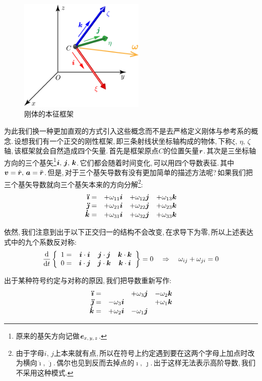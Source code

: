 \begin{figure}\label{6-1-8}
\vspace{-0.2cm}
\centering
\includegraphics[width=6cm]{image/6-1-8.png}
\caption{刚体的本征框架}
\end{figure}
为此我们换一种更加直观的方式引入这些概念而不是去严格定义刚体与参考系的概念.\,设想我们有一个正交的刚性框架,\,即三条射线状坐标轴构成的物体,\,下称$\xi,\,\eta,\,\zeta$轴,\,该框架就会自然造成四个矢量.\,首先是框架原点$C$的位置矢量$\boldsymbol{r}$.\,其次是三坐标轴方向的三个基矢\footnote{原来的基矢方向记做$\boldsymbol{e}_{x,\,y,\,z}$.}$\boldsymbol{i},\,\boldsymbol{j},\,\boldsymbol{k}$.\,它们都会随着时间变化,\,可以用四个导数表征.\,其中$\boldsymbol{v}=\dot{\boldsymbol{r}},\,\boldsymbol{a}=\ddot{\boldsymbol{r}}$.\,但是,\,对于三个基矢导数有没有更加简单的描述方法呢?\,如果我们把三个基矢导数就向三个基矢本来的方向分解\footnote{由于字母$i,\,j$上本来就有点,\,所以在符号上约定遇到要在这两个字母上加点时改为横向$\ddot{\imath},\,\ddot{\jmath}$.\,偶尔也见到反而去掉点的$\imath,\,\jmath$.\,出于这样无法表示高阶导数,\,我们不采用这种模式.}:
\[\begin{array}{rlll}
\boldsymbol{\ddot{\imath}}=		&	+\omega_{11}\boldsymbol{i} 	&	+\omega_{12}\boldsymbol{j} 		& +\omega_{13}\boldsymbol{k}\\
\boldsymbol{\ddot{\jmath}}=		&	+\omega_{21}\boldsymbol{i} 	&	+\omega_{22}\boldsymbol{j} 		& +\omega_{23}\boldsymbol{k}\\
\boldsymbol{\dot{k}}=				&	+\omega_{31}\boldsymbol{i} 	&	+\omega_{32}\boldsymbol{j} 		& +\omega_{33}\boldsymbol{k}
\end{array}\]

依然,\,我们注意到出于以下正交归一的结构不会改变,\,在求导下为零,\,所以上述表达式中的九个系数反对称:
\[\frac{\textrm{d}}{\textrm{d} t}\left\{\begin{array}{cccc}
1= 	&\boldsymbol{i}\cdot\boldsymbol{i} 	&\boldsymbol{j}\cdot\boldsymbol{j} 	&\boldsymbol{k}\cdot\boldsymbol{k} 	\\
0= 	&\boldsymbol{i}\cdot\boldsymbol{j} 	&\boldsymbol{j}\cdot\boldsymbol{k} 	&\boldsymbol{k}\cdot\boldsymbol{i}
\end{array}\right\}=0\quad \Rightarrow \quad\omega_{ij}+\omega_{ji}=0\]

出于某种符号约定与对称的原因,\,我们把导数重新写作:
\[\begin{array}{rlll}
\boldsymbol{\ddot{\imath}}=		&									 	&	+\omega_3\boldsymbol{j} 				& -\omega_2\boldsymbol{k}\\
\boldsymbol{\ddot{\jmath}}=		&	-\omega_3\boldsymbol{i} 			&									 		& +\omega_1\boldsymbol{k}\\
\boldsymbol{\dot{k}}=				&	+\omega_2\boldsymbol{i} 			&	-\omega_1\boldsymbol{j} 				& 
\end{array}\]

